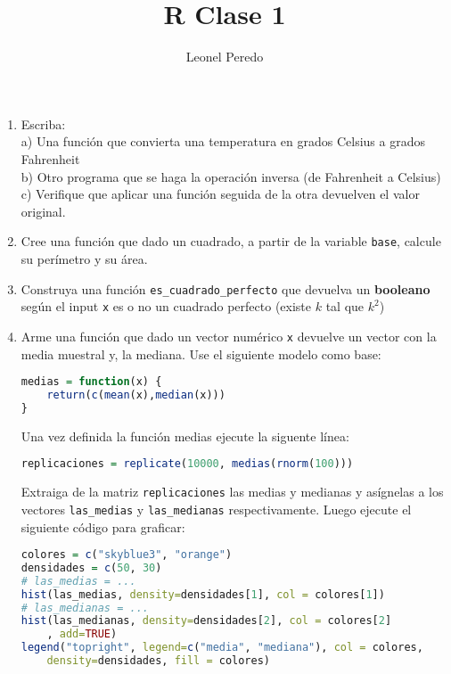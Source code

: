 \documentclass{article}
\title{R Clase 1}
\author{Leonel Peredo}
\begin{document}
\maketitle

\begin{enumerate}
\item 
Escriba: \\
a) Una función que convierta una temperatura en grados Celsius a grados Fahrenheit \\
b) Otro programa que se haga la operación inversa (de Fahrenheit a Celsius) \\
c) Verifique que aplicar una función seguida de la otra devuelven el valor original. 

\item  Cree una función que dado un cuadrado, a partir de la variable \texttt{base}, calcule su perímetro y su área.

\item Construya una función \texttt{es\_cuadrado\_perfecto} que devuelva un \textbf{booleano} según el input \texttt{x} es o no un cuadrado perfecto (existe $k$ tal que $k^2$)

\item Arme una función que dado un vector numérico \texttt{x} devuelve un vector con la media muestral y, la mediana. Use el siguiente modelo como base:

\begin{lstlisting}[language=R]
medias = function(x) {
    return(c(mean(x),median(x)))
}
\end{lstlisting}

Una vez definida la función medias ejecute la siguente línea:

\begin{lstlisting}[language=R]
replicaciones = replicate(10000, medias(rnorm(100)))
\end{lstlisting}

Extraiga de la matriz \texttt{replicaciones} las medias y medianas y asígnelas a los vectores  \texttt{las\_medias} y  \texttt{las\_medianas} respectivamente. Luego ejecute el siguiente código para graficar:

\begin{lstlisting}[language=R]
colores = c("skyblue3", "orange")
densidades = c(50, 30)
# las_medias = ...
hist(las_medias, density=densidades[1], col = colores[1])
# las_medianas = ...
hist(las_medianas, density=densidades[2], col = colores[2]
    , add=TRUE)
legend("topright", legend=c("media", "mediana"), col = colores, 
    density=densidades, fill = colores)
\end{lstlisting}


\end{enumerate}
\end{document}
